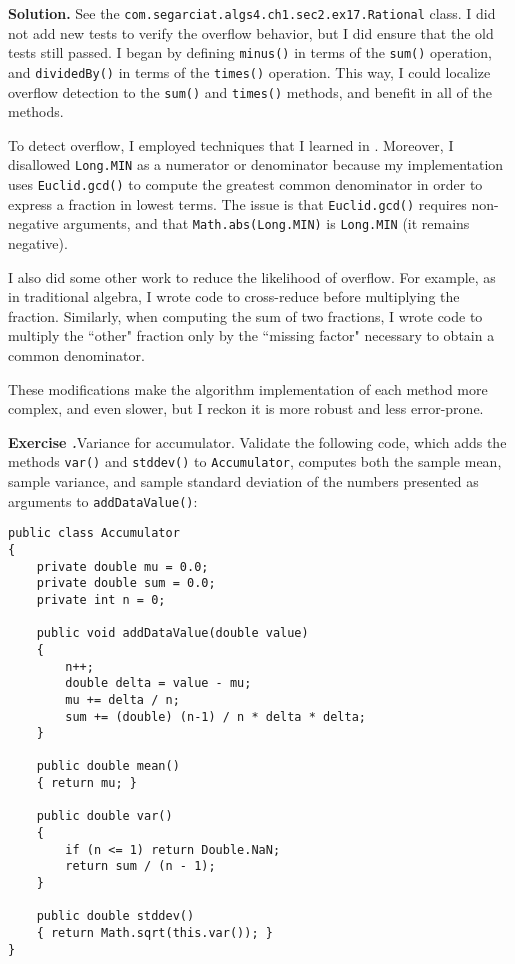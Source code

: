 \documentclass[12pt, a4paper]{article}
\newenvironment{ex}[2][Exercise]
{\par\medskip\noindent \textbf{#1 #2.}}
{\medskip}
\newenvironment{sol}[1][Solution]
{\par\medskip\noindent \textbf{#1.} }
{\medskip}
\begin{document}
	\begin{sol}
		See the \texttt{com.segarciat.algs4.ch1.sec2.ex17.Rational} class. I did not add
		new tests to verify the overflow behavior, but I did ensure that the old tests
		still passed. I began by defining \texttt{minus()} in terms of the \texttt{sum()}
		operation, and \texttt{dividedBy()} in terms of the \texttt{times()} operation.
		This way, I could localize overflow detection to the \texttt{sum()} and \texttt{times()}
		methods, and benefit in all of the methods.
		
		To detect overflow, I employed techniques that I learned in \cite{csapp}. Moreover,
		I disallowed \texttt{Long.MIN} as a numerator or denominator because my implementation
		uses \texttt{Euclid.gcd()} to compute the greatest common denominator in order to express
		a fraction in lowest terms. The issue is that \texttt{Euclid.gcd()} requires non-negative
		arguments, and that \texttt{Math.abs(Long.MIN)} is \texttt{Long.MIN} (it remains negative).
		
		I also did some other work to reduce the likelihood of overflow. For example, as in
		traditional algebra, I wrote code to cross-reduce before multiplying the fraction.
		Similarly, when computing the sum of two fractions, I wrote code to multiply the ``other"
		fraction only by the ``missing factor" necessary to obtain a common denominator.
		
		These modifications make the algorithm implementation of each method more complex,
		and even slower, but I reckon it is more robust and less error-prone.
	\end{sol}
	\begin{ex}{18}
		\emph{Variance for accumulator}. Validate the following code, which adds the methods
		\texttt{var()} and \texttt{stddev()} to \texttt{Accumulator}, computes both the
		sample mean, sample variance, and sample standard deviation of the numbers  presented
		as arguments to \texttt{addDataValue()}:
		\begin{lstlisting}
public class Accumulator
{
	private double mu = 0.0;
	private double sum = 0.0;
	private int n = 0;
	
	public void addDataValue(double value)
	{
		n++;
		double delta = value - mu;
		mu += delta / n;
		sum += (double) (n-1) / n * delta * delta;
	}

	public double mean()
	{ return mu; }
	
	public double var()
	{
		if (n <= 1) return Double.NaN;
		return sum / (n - 1);
	}

	public double stddev()
	{ return Math.sqrt(this.var()); }
}
		\end{lstlisting}
	\end{ex}
\end{document}
